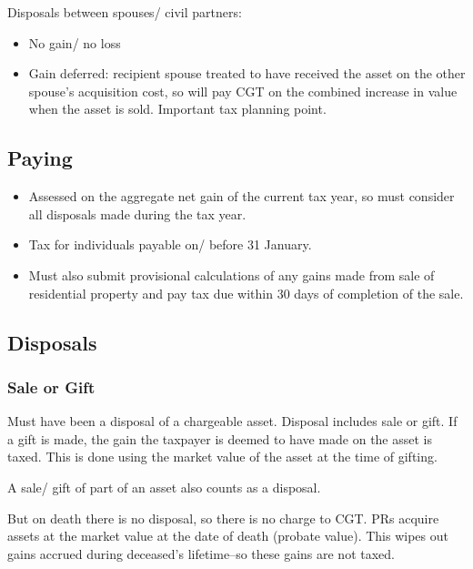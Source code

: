 \documentclass[
]{article}
\providecommand{\tightlist}{%
  \setlength{\itemsep}{0pt}\setlength{\parskip}{0pt}}
\begin{document}
Disposals between spouses/ civil partners:

\begin{itemize}
\tightlist
\item
  No gain/ no loss
\item
  Gain deferred: recipient spouse treated to have received the asset on
  the other spouse's acquisition cost, so will pay CGT on the combined
  increase in value when the asset is sold. Important tax planning
  point.
\end{itemize}

\hypertarget{paying}{%
\subsection{Paying}\label{paying}}

\begin{itemize}
\tightlist
\item
  Assessed on the aggregate net gain of the current tax year, so must
  consider all disposals made during the tax year.
\item
  Tax for individuals payable on/ before 31 January.
\item
  Must also submit provisional calculations of any gains made from sale
  of residential property and pay tax due within 30 days of completion
  of the sale.
\end{itemize}

\hypertarget{disposals}{%
\subsection{Disposals}\label{disposals}}

\hypertarget{sale-or-gift}{%
\subsubsection{Sale or Gift}\label{sale-or-gift}}

Must have been a disposal of a chargeable asset. Disposal includes sale
or gift. If a gift is made, the gain the taxpayer is deemed to have made
on the asset is taxed. This is done using the market value of the asset
at the time of gifting.

A sale/ gift of part of an asset also counts as a disposal.

But on death there is no disposal, so there is no charge to CGT. PRs
acquire assets at the market value at the date of death (probate value).
This wipes out gains accrued during deceased's lifetime--so these gains
are not taxed.
\end{document}
